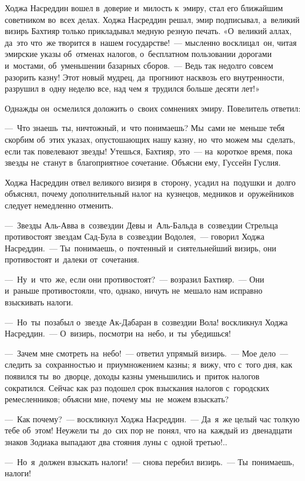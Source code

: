 \documentclass[12pt,a4paper]{book}
\begin{document}
Ходжа Насреддин вошел в~доверие и~милость к~эмиру, стал его ближайшим советником во~всех делах. Ходжа Насреддин решал, эмир подписывал, а~великий визирь Бахтияр только прикладывал медную резную печать. «О~великий аллах, да~это что~же творится в~нашем государстве!~— мысленно восклицал~он, читая эмирские указы об~отменах налогов, о~бесплатном пользовании дорогами и~мостами, об~уменьшении базарных сборов.~— Ведь так недолго совсем разорить казну! Этот новый мудрец, да~прогниют насквозь его внутренности, разрушил в~одну неделю все, над чем я~трудился больше десяти лет!»

Однажды он~осмелился доложить о~своих сомнениях эмиру. Повелитель ответил:

—~Что знаешь~ты, ничтожный, и~что понимаешь? Мы~сами не~меньше тебя скорбим об~этих указах, опустошающих нашу казну, но~что можем мы~сделать, если так повелевают звезды! Утешься, Бахтияр, это~— на~короткое время, пока звезды не~станут в~благоприятное сочетание. Объясни ему, Гуссейн Гуслия.

Ходжа Насреддин отвел великого визиря в~сторону, усадил на~подушки и~долго объяснял, почему дополнительный налог на~кузнецов, медников и~оружейников следует немедленно отменить.

—~Звезды Аль-Авва в~созвездии Девы и~Аль-Бальда в~созвездии Стрельца противостоят звездам Сад-Була в~созвездии Водолея,~— говорил Ходжа Насреддин.~— Ты~понимаешь, о~почтенный и~сиятельнейший визирь, они противостоят и~далеки от~сочетания.

—~Ну~и~что~же, если они противостоят?~— возразил Бахтияр.~— Они и~раньше противостояли, что, однако, ничуть не~мешало нам исправно взыскивать налоги.

—~Но~ты~позабыл о~звезде Ак-Дабаран в~созвездии Вола! воскликнул Ходжа Насреддин.~— О~визирь, посмотри на~небо, и~ты~убедишься!

—~Зачем мне смотреть на~небо!~— ответил упрямый визирь.~— Мое дело~— следить за~сохранностью и~приумножением казны; я~вижу, что с~того дня, как появился ты~во~дворце, доходы казны уменьшились и~приток налогов сократился. Сейчас как раз подошел срок взыскания налогов с~городских ремесленников; объясни мне, почему мы~не~можем взыскать?

—~Как почему?~— воскликнул Ходжа Насреддин.~— Да~я~же целый час толкую тебе об~этом! Неужели ты~до~сих пор не~понял, что на~каждый из~двенадцати знаков Зодиака выпадают два стояния луны с~одной третью!..

—~Но~я~должен взыскать налоги!~— снова перебил визирь.~— Ты~понимаешь, налоги!
\end{document}
